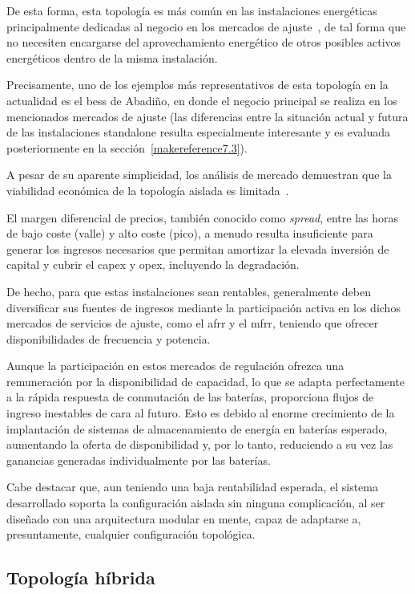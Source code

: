 De esta forma, esta topología es más común en las instalaciones energéticas principalmente dedicadas al negocio en los mercados de ajuste~\cite{carbajo2007mercados}, de tal forma que no necesiten encargarse del aprovechamiento energético de otros posibles activos energéticos dentro de la misma instalación.

Precisamente, uno de los ejemplos más representativos de esta topología en la actualidad es el \gls{bess} de Abadiño, en donde el negocio principal se realiza en los mencionados mercados de ajuste (las diferencias entre la situación actual y futura de las instalaciones standalone resulta especialmente interesante y es evaluada posteriormente en la sección~\ref{makereference7.3}).

A pesar de su aparente simplicidad, los análisis de mercado demuestran que la viabilidad económica de la topología aislada es limitada~\cite{azahra2020optimized, baviskar2023opportunities, kalenderova2024batery}.

El margen diferencial de precios, también conocido como \textit{spread}, entre las horas de bajo coste (valle) y alto coste (pico), a menudo resulta insuficiente para generar los ingresos necesarios que permitan amortizar la elevada inversión de capital y cubrir el \gls{capex} y \gls{opex}, incluyendo la degradación.

De hecho, para que estas instalaciones sean rentables, generalmente deben diversificar sus fuentes de ingresos mediante la participación activa en los dichos mercados de servicios de ajuste, como el \gls{afrr} y el \gls{mfrr}, teniendo que ofrecer disponibilidades de frecuencia y potencia.

Aunque la participación en estos mercados de regulación ofrezca una remuneración por la disponibilidad de capacidad, lo que se adapta perfectamente a la rápida respuesta de conmutación de las baterías, proporciona flujos de ingreso inestables de cara al futuro. Esto es debido al enorme crecimiento de la implantación de sistemas de almacenamiento de energía en baterías esperado, aumentando la oferta de disponibilidad y, por lo tanto, reduciendo a su vez las ganancias generadas individualmente por las baterías.

Cabe destacar que, aun teniendo una baja rentabilidad esperada, el sistema desarrollado soporta la configuración aislada sin ninguna complicación, al ser diseñado con una arquitectura modular en mente, capaz de adaptarse a, presuntamente, cualquier configuración topológica.

\subsection{Topología híbrida}
\label{makereference3.1.2}

